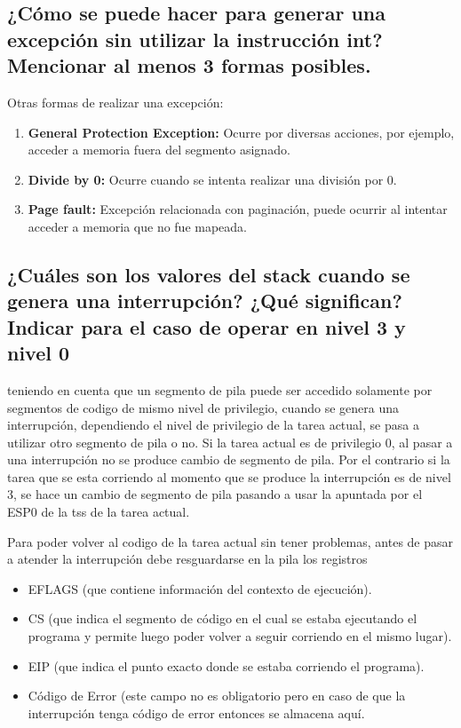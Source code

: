 \documentclass[a4paper,10pt,twoside]{article}
\begin{document}
\subsection{¿Cómo se puede hacer para generar una excepción sin utilizar la instrucción int? Mencionar al menos 3 formas posibles.}
Otras formas de realizar una excepción:
\begin{enumerate}
	\item \textbf{General Protection Exception:}
	Ocurre por diversas acciones, por ejemplo, acceder a memoria fuera del segmento asignado.
	\item \textbf{Divide by 0:}
	Ocurre cuando se intenta realizar una división por 0.
	\item \textbf{Page fault:}
	Excepción relacionada con paginación, puede ocurrir al intentar acceder a memoria que no fue mapeada.
\end{enumerate}

\subsection{¿Cuáles son los valores del stack cuando se genera una interrupción? ¿Qué significan? Indicar para el caso de operar en nivel 3 y nivel 0}
teniendo en cuenta que un segmento de pila puede ser accedido solamente por segmentos de codigo de mismo nivel de privilegio, cuando se genera una interrupción, dependiendo el nivel de privilegio de la tarea actual, se pasa a utilizar otro segmento de pila o no. Si la tarea actual es de privilegio 0, al pasar a una interrupción no se produce cambio de segmento de pila. Por el contrario si la tarea que se esta corriendo al momento que se produce la interrupción es de nivel 3, se hace un cambio de segmento de pila pasando a usar la apuntada por el ESP0 de la tss de la tarea actual.

Para poder volver al codigo de la tarea actual sin tener problemas, antes de pasar a atender la interrupción debe resguardarse en la pila los registros
\begin{itemize}
 \item EFLAGS (que contiene información del contexto de ejecución).
 \item CS (que indica el segmento de código en el cual se estaba ejecutando el programa y permite luego poder volver a seguir corriendo en el mismo lugar).
 \item EIP (que indica el punto exacto donde se estaba corriendo el programa).
 \item Código de Error (este campo no es obligatorio pero en caso de que la interrupción tenga código de error entonces se almacena aquí.
\end{itemize}
\end{document}
